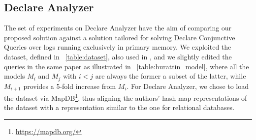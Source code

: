 \subsection{Declare Analyzer}\label{ssec:declan}
The set of experiments on Declare Analyzer have the aim of comparing our proposed solution against a solution tailored for solving Declare Conjunctive Queries over logs running exclusively in primary memory. %
We exploited the   dataset, defined in \tablename~\ref{table:dataset}, also used in \cite{BurattinMS16}, and we slightly edited the queries in the same paper as illustrated in \tablename~\ref{table:burattin_model}, where all the models $M_i$ and $M_j$ with $i<j$ are always the former a subset of the latter, while $M_{i+1}$ provides a 5-fold increase from $M_i$. For Declare Analyzer, we chose to load the dataset via MapDB\footnote{\url{https://mapdb.org/}}, thus aligning the authors' hash map representations of the dataset with a representation similar to the one for relational databases. 


